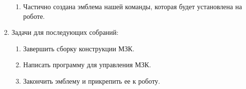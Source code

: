 \begin{enumerate}
\begin{enumerate}
		\item Частично создана эмблема нашей команды, которая будет установлена на роботе.
		
	\end{enumerate}
	
	\item Задачи для последующих собраний:
	\begin{enumerate}
		\item Завершить сборку конструкции МЗК.
		
		\item Написать программу для управления МЗК.
		
		\item Закончить эмблему и прикрепить ее к роботу.
		
	\end{enumerate}     
\end{enumerate}
\fillpage

